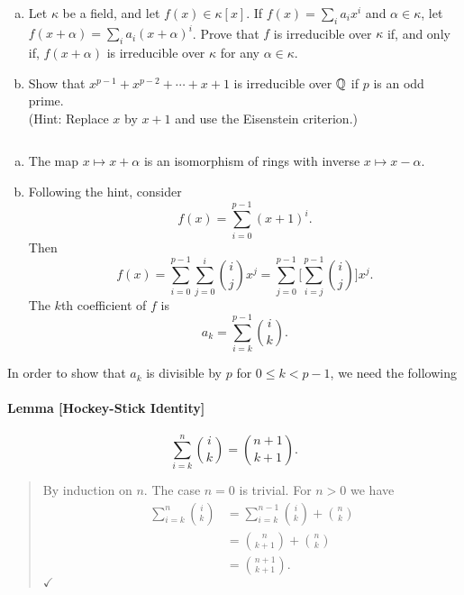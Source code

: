 \begin{probl}${}$\label{probl:x^p-1/(x-1)-irred}
    \begin{enumerate}[a), font=\upshape]
        \item Let\/ $\kappa$ be a field, and let\/ $f(x) \in \kappa[x]$. If\/ $f(x) = \sum_i a_i x^i$ and\/ $\alpha \in \kappa$, let\/ $f(x + \alpha) = \sum_i a_i (x + \alpha)^i$. Prove that\/ $f$ is irreducible over\/ $\kappa$ if, and only if, $f(x + \alpha)$ is irreducible over\/ $\kappa$ for any\/ $\alpha \in \kappa$.
        
        \item Show that\/ $x^{p-1} + x^{p-2} + \cdots + x + 1$ is irreducible over\/ $\mathbb{Q}$ if\/ $p$ is an odd prime.\\
        {\rm(Hint: Replace $x$ by $x + 1$ and use the Eisenstein criterion.)}
    \end{enumerate}

    \begin{solution}${}$
        \begin{enumerate}[a), font=\upshape]
            \item The map $x\mapsto x+\alpha$ is an isomorphism of rings with inverse $x\mapsto x-\alpha$.

            \item Following the hint, consider
            $$
                f(x) = \sum_{i=0}^{p-1} (x+1)^i.
            $$
            Then
            $$
                f(x) = \sum_{i=0}^{p-1}\sum_{j=0}^i\binom ij x^j
                    = \sum_{j=0}^{p-1}\bigg[\sum_{i=j}^{p-1}\binom ij\bigg]x^j.
            $$
            The $k$th coefficient of $f$ is
            $$
                a_k = \sum_{i=k}^{p-1}\binom ik.
            $$
        \end{enumerate}
        In order to show that $a_k$ is divisible by $p$ for $0\le k<p-1$, we need the following

        \paragraph{Lemma {\rm[Hockey-Stick Identity]}}
        $$
            \sum_{i=k}^n\binom ik = \binom{n+1}{k+1}.
        $$
        \begin{quote}\small
            \proof
                By induction on $n$. The case $n=0$ is trivial. For $n>0$ we have
                \begin{align*}
                    \sum_{i=k}^n\binom ik &= \sum_{i=k}^{n-1}\binom ik+\binom nk\\
                        &= \binom n{k+1} + \binom nk\\
                        &= \binom{n+1}{k+1}.
                \end{align*}
            \hfill $\checkmark$
        \end{quote}
        

\end{solution}
\end{probl}
